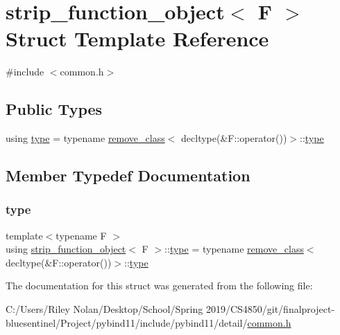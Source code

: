 \hypertarget{structstrip__function__object}{}\section{strip\+\_\+function\+\_\+object$<$ F $>$ Struct Template Reference}
\label{structstrip__function__object}


{\ttfamily \#include $<$common.\+h$>$}

\subsection*{Public Types}
\begin{DoxyCompactItemize}
\item 
using \mbox{\hyperlink{structstrip__function__object_a2c2099889eda598b98649c7f33b35302}{type}} = typename \mbox{\hyperlink{structremove__class}{remove\+\_\+class}}$<$ decltype(\&F\+::operator())$>$\+::\mbox{\hyperlink{structstrip__function__object_a2c2099889eda598b98649c7f33b35302}{type}}
\end{DoxyCompactItemize}


\subsection{Member Typedef Documentation}
\mbox{\label{structstrip__function__object_a2c2099889eda598b98649c7f33b35302}} 
\subsubsection{\texorpdfstring{type}{type}}
{\footnotesize\ttfamily template$<$typename F $>$ \\
using \mbox{\hyperlink{structstrip__function__object}{strip\+\_\+function\+\_\+object}}$<$ F $>$\+::\mbox{\hyperlink{structstrip__function__object_a2c2099889eda598b98649c7f33b35302}{type}} =  typename \mbox{\hyperlink{structremove__class}{remove\+\_\+class}}$<$decltype(\&F\+::operator())$>$\+::\mbox{\hyperlink{structstrip__function__object_a2c2099889eda598b98649c7f33b35302}{type}}}



The documentation for this struct was generated from the following file\+:\begin{DoxyCompactItemize}
\item 
C\+:/\+Users/\+Riley Nolan/\+Desktop/\+School/\+Spring 2019/\+C\+S4850/git/finalproject-\/bluesentinel/\+Project/pybind11/include/pybind11/detail/\mbox{\hyperlink{detail_2common_8h}{common.\+h}}\end{DoxyCompactItemize}
